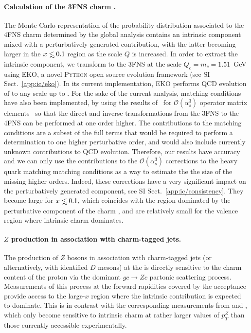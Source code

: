 \paragraph{Calculation of the 3FNS charm \pdf.}
%
The Monte Carlo representation of the probability distribution associated to
the 4FNS charm \pdf determined by the global
analysis contains an intrinsic component mixed with a perturbatively
generated contribution, with the latter
becoming larger in the $x\lsim 0.1$ region as the scale $Q$ is increased.
%
In order to extract the intrinsic component, 
we transform \pdfs to the 3FNS at the scale $Q_c=m_c=1.51$~GeV using
\textsc{\small EKO}, a novel \textsc{\small Python} open source
\pdf evolution framework (see  SI Sect.~\ref{app:ic/eko}).
%
In its current implementation, \textsc{\small EKO} performs  QCD 
evolution of \pdfs to any scale
up to \nnlo. For
the sake of the current analysis, \nnnlo matching conditions have also
been implemented, by 
using  the results
of~\cite{Bierenbaum:2009zt,Bierenbaum:2009mv,Ablinger:2010ty,Ablinger:2014vwa,Ablinger:2014uka,Behring:2014eya,Ablinger_2014,Ablinger:2014nga,Blumlein:2017wxd}
for $\mathcal{O}(\alpha_s^3)$ operator matrix elements~
so that the direct and inverse transformations from the 3FNS to the
4FNS can be performed at one order
higher.
%
The \nnnlo contributions to the matching conditions are a subset of
the full \nnnlo terms that would be required to perform a \pdf determination
 to one higher perturbative order, and would
also include currently unknown
\nnnlo contributions to QCD evolution. Therefore, our results have 
\nnlo accuracy and we can only use the  \nnnlo contributions to the
 $\mathcal{O}(\alpha_s^3)$ corrections to the
heavy quark matching
matching conditions as a way to estimate the 
the size of the missing higher orders. 
Indeed, these corrections have a very 
significant impact on the
perturbatively generated component, see SI Sect.~\ref{app:ic/consistency}.
%
They become large for $x \lsim 0.1$, which coincides with the region
dominated by the perturbative component of the charm \pdf,
  and are relatively small for the valence region
  where intrinsic charm dominates.
  
\paragraph{$Z$ production in association with charm-tagged jets.}
%
The production of $Z$ bosons in association with charm-tagged jets (or alternatively,
with identified $D$ mesons) at the \lhc is directly sensitive to the charm content
of the proton via the dominant $gc \to Zc$ partonic scattering process.
%
Measurements of this process at  the forward rapidities covered by the
\lhcb acceptance provide access to the large-$x$ region where the intrinsic 
contribution is expected to dominate.
%
This is in contrast with the corresponding measurements from \atlas and \cms,
which only become sensitive to intrinsic charm
at rather larger values of $p_T^Z$ than those
currently accessible experimentally.

